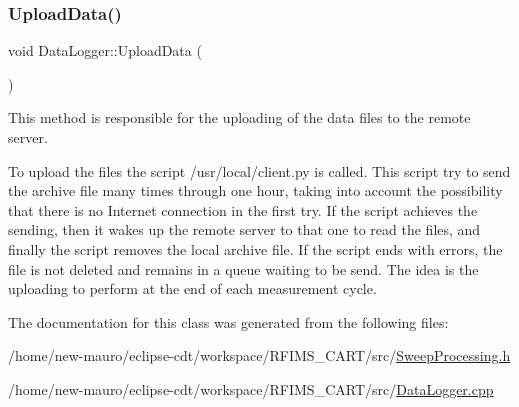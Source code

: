 \subsubsection{\texorpdfstring{Upload\+Data()}{UploadData()}}
{\footnotesize\ttfamily void Data\+Logger\+::\+Upload\+Data (\begin{DoxyParamCaption}{ }\end{DoxyParamCaption})}



This method is responsible for the uploading of the data files to the remote server. 

To upload the files the script /usr/local/client.py is called. This script try to send the archive file many times through one hour, taking into account the possibility that there is no Internet connection in the first try. If the script achieves the sending, then it wakes up the remote server to that one to read the files, and finally the script removes the local archive file. If the script ends with errors, the file is not deleted and remains in a queue waiting to be send. The idea is the uploading to perform at the end of each measurement cycle. 

The documentation for this class was generated from the following files\+:\begin{DoxyCompactItemize}
\item 
/home/new-\/mauro/eclipse-\/cdt/workspace/\+R\+F\+I\+M\+S\+\_\+\+C\+A\+R\+T/src/\hyperlink{SweepProcessing_8h}{Sweep\+Processing.\+h}\item 
/home/new-\/mauro/eclipse-\/cdt/workspace/\+R\+F\+I\+M\+S\+\_\+\+C\+A\+R\+T/src/\hyperlink{DataLogger_8cpp}{Data\+Logger.\+cpp}\end{DoxyCompactItemize}
